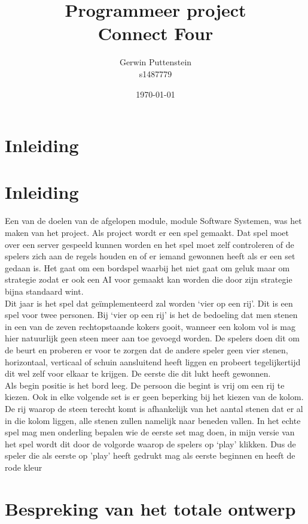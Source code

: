 \documentclass[12pt]{article}
\begin{document}
\title{Programmeer project\\Connect Four}
\author{Gerwin Puttenstein\\s1487779}
\date{\today}
\maketitle
\newpage
\tableofcontents
\newpage
\section{Inleiding}
\section{Inleiding}
Een van de doelen van de afgelopen module, module Software Systemen, was het maken van het project. Als project wordt er een spel gemaakt. Dat spel moet over een server gespeeld kunnen worden en het spel moet zelf controleren of de spelers zich aan de regels houden en of er iemand gewonnen heeft als er een set gedaan is. Het gaat om een bordspel waarbij het niet gaat om geluk maar om strategie zodat er ook een AI voor gemaakt kan worden die door zijn strategie bijna standaard wint.\\
Dit jaar is het spel dat ge\"implementeerd zal worden `vier op een rij'. Dit is een spel voor twee personen. Bij `vier op een rij' is het de bedoeling dat men stenen in een van de zeven rechtopstaande kokers gooit, wanneer een kolom vol is mag hier natuurlijk geen steen meer aan toe gevoegd worden. De spelers doen dit om de beurt en proberen er voor te zorgen dat de andere speler geen vier stenen, horizontaal, verticaal of schuin aansluitend heeft liggen en probeert tegelijkertijd dit wel zelf voor elkaar te krijgen. De eerste die dit lukt heeft gewonnen.\\
Als begin positie is het bord leeg. De persoon die begint is vrij om een rij te kiezen. Ook in elke volgende set is er geen beperking bij het kiezen van de kolom. De rij waarop de steen terecht komt is afhankelijk van het aantal stenen dat er al in die kolom liggen, alle stenen zullen namelijk naar beneden vallen. In het echte spel mag men onderling bepalen wie de eerste set mag doen, in mijn versie van het spel wordt dit door de volgorde waarop de spelers op `play' klikken. Dus de speler die als eerste op 'play' heeft gedrukt mag als eerste beginnen en heeft de rode kleur\\
\newpage 
\section{Bespreking van het totale ontwerp}
\end{document}
